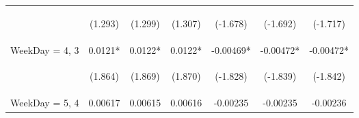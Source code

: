 \documentclass[]{article}
\begin{document}
\begin{center}
\begin{tabular}{lcccccc}
        \vspace{4pt}     & \begin{footnotesize}(1.293)\end{footnotesize}  & \begin{footnotesize}(1.299)\end{footnotesize}  & \begin{footnotesize}(1.307)\end{footnotesize}  & \begin{footnotesize}(-1.678)\end{footnotesize} & \begin{footnotesize}(-1.692)\end{footnotesize} & \begin{footnotesize}(-1.717)\end{footnotesize} \\
        WeekDay = 4, 3   & 0.0121*                                        & 0.0122*                                        & 0.0122*                                        & -0.00469*                                      & -0.00472*                                      & -0.00472*                                      \\
        \vspace{4pt}     & \begin{footnotesize}(1.864)\end{footnotesize}  & \begin{footnotesize}(1.869)\end{footnotesize}  & \begin{footnotesize}(1.870)\end{footnotesize}  & \begin{footnotesize}(-1.828)\end{footnotesize} & \begin{footnotesize}(-1.839)\end{footnotesize} & \begin{footnotesize}(-1.842)\end{footnotesize} \\
        WeekDay = 5, 4   & 0.00617                                        & 0.00615                                        & 0.00616                                        & -0.00235                                       & -0.00235                                       & -0.00236                                       \\

\end{tabular}
\end{center}
\end{document}
